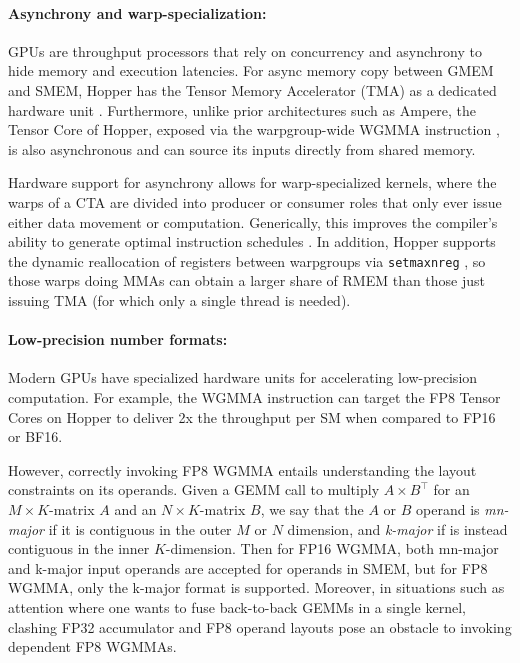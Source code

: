 \paragraph{Asynchrony and warp-specialization:}

GPUs are throughput processors that rely on concurrency and asynchrony to hide memory and execution latencies.
For async memory copy between GMEM and SMEM, Hopper has the Tensor Memory Accelerator (TMA) as a dedicated hardware unit \cite[\S7.29]{cuda}.
Furthermore, unlike prior architectures such as Ampere, the Tensor Core of Hopper, exposed via the warpgroup-wide WGMMA instruction \cite[\S9.7.14]{ptx}, is also asynchronous and can source its inputs directly from shared memory.

Hardware support for asynchrony allows for warp-specialized kernels, where the warps of a CTA are divided into producer or consumer roles that only ever issue either data movement or computation.
Generically, this improves the compiler's ability to generate optimal instruction schedules \citep{warp-specialization-2011}.
In addition, Hopper supports the dynamic reallocation of registers between warpgroups via \verb|setmaxnreg| \cite[\S9.7.17.1]{ptx}, so those warps doing MMAs can obtain a larger share of RMEM than those just issuing TMA (for which only a single thread is needed).




\paragraph{Low-precision number formats:}
\label{sec:low-precision-gpu}
Modern GPUs have specialized hardware units for accelerating low-precision computation.
For example, the WGMMA instruction can target the FP8 Tensor Cores on Hopper to deliver 2x the throughput per SM when compared to FP16 or BF16.

However, correctly invoking FP8 WGMMA entails understanding the layout constraints on its operands. 
Given a GEMM call to multiply $A \times B^{\top}$ for an $M\times K$-matrix $A$ and an $N\times K$-matrix $B$, we say that the $A$ or $B$ operand is \emph{mn-major} if it is contiguous in the outer $M$ or $N$ dimension, and \emph{k-major} if is instead contiguous in the inner $K$-dimension.
Then for FP16 WGMMA, both mn-major and k-major input operands are accepted for operands in SMEM, but for FP8 WGMMA, only the k-major format is supported.
Moreover, in situations such as attention where one wants to fuse back-to-back GEMMs in a single kernel, clashing FP32 accumulator and FP8 operand layouts pose an obstacle to invoking dependent FP8 WGMMAs.

